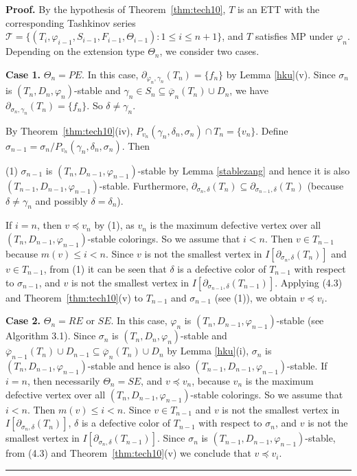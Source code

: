 \documentclass[11pt]{article}
\newcommand{\TT}{\mathcal {T}}
\newcommand{\phibar}{\overline{\varphi}}
\newcommand{\phiv}{\varphi}
\def\qed{\hfill \rule{4pt}{7pt}}
\begin{document}
{\bf Proof.} By the hypothesis of Theorem~\ref{thm:tech10}, $T$ is an ETT with the corresponding Tashkinov series 
$\TT=\{(T_i, \phiv_{i-1}, S_{i-1}, F_{i-1}, \Theta_{i-1}): 1\le i \le n+1\}$, and $T$ satisfies MP under $\varphi_n$. 
Depending on the extension type $\Theta_n$, we consider two cases.

{\bf Case 1.} $\Theta_n=PE$.  In this case, $\partial_{\varphi_n, \gamma_n}(T_n)=\{f_n\}$ by Lemma \ref{hku}(v).
Since $\sigma_n$ is $(T_n, D_n, \phiv_n)$-stable and $\gamma_n\in S_n\subseteq \phibar_n(T_n)\cup D_n$, we have
$\partial_{\sigma_n, \gamma_n}(T_n)=\{f_n\}$. So $\delta\ne \gamma_n$.  

By Theorem~\ref{thm:tech10}(iv), $P_{v_{n}}(\gamma_{n},\delta_{n},\sigma_n)\cap T_{n}=\{v_{n}\}$. Define $\sigma_{n-1}=\sigma_n/P_{v_{n}} (\gamma_{n},\delta_{n}, \sigma_n)$.  Then

(1) $\sigma_{n-1}$ is $(T_{n},D_{n-1},\varphi_{n-1})$-stable by Lemma \ref{stablezang} and hence it
is also $(T_{n-1},D_{n-1},\varphi_{n-1})$-stable. Furthermore, $\partial_{\sigma_n, \delta}(T_n) \subseteq 
\partial_{\sigma_{n-1}, \delta}(T_n)$ (because $\delta\ne \gamma_n$ and possibly $\delta=\delta_n$).

If $i=n$, then $v\preceq v_n$ by (1), as $v_n$ is the maximum defective vertex over all $(T_n, D_{n-1}, \phiv_{n-1})$-stable colorings. So we 
assume that $i<n$. Then $v\in T_{n-1}$ because $m(v)\leq i< n$. Since $v$ is not the smallest vertex in $I[\partial_{\sigma_n, 
\delta}(T_n)]$ and $v\in T_{n-1}$, from (1) it can be seen that  $\delta$ is a defective 
color of $T_{n-1}$ with respect to $\sigma_{n-1}$, and $v$ is not the smallest vertex in $I[\partial_{\sigma_{n-1}, 
	\delta}(T_{n-1})]$. Applying (4.3) and Theorem~\ref{thm:tech10}(v) to $T_{n-1}$ and $\sigma_{n-1}$ 
(see (1)), we obtain $v\preceq v_i$. 

{\bf Case 2.} $\Theta_n=RE$ or $SE$.  In this case, $\varphi_n$ is $(T_{n},D_{n-1},\varphi_{n-1})$-stable (see Algorithm 3.1).
Since $\sigma_n$ is $(T_n, D_n, \phiv_n)$-stable and $\phibar_{n-1}(T_n)\cup D_{n-1}\subseteq \phibar_{n}(T_n)\cup D_n$
by Lemma \ref{hku}(i), $\sigma_n$ is $(T_n,D_{n-1},\varphi_{n-1})$-stable and hence is also $(T_{n-1},D_{n-1},\varphi_{n-1})$-stable.  
If $i=n$, then necessarily $\Theta_n=SE$, and $v\preceq v_n$, because $v_n$ is the maximum defective vertex over all $(T_n,D_{n-1},\phiv_{n-1})$-stable colorings. 
So we assume that $i<n$. Then $m(v)\le i <n$. Since $v\in T_{n-1}$ and $v$ is not the smallest vertex in $I[\partial_{\sigma_n, \delta}(T_n)]$, 
$\delta$ is a defective color of $T_{n-1}$ with respect to $\sigma_n$, and $v$ is not the smallest vertex in $I[\partial_{\sigma_n, 
\delta}(T_{n-1})]$. Since $\sigma_n$ is $(T_{n-1},D_{n-1},\varphi_{n-1})$-stable, from (4.3) and Theorem~\ref{thm:tech10}(v)
we conclude that $v\preceq v_i$.  \qed
\end{document}
